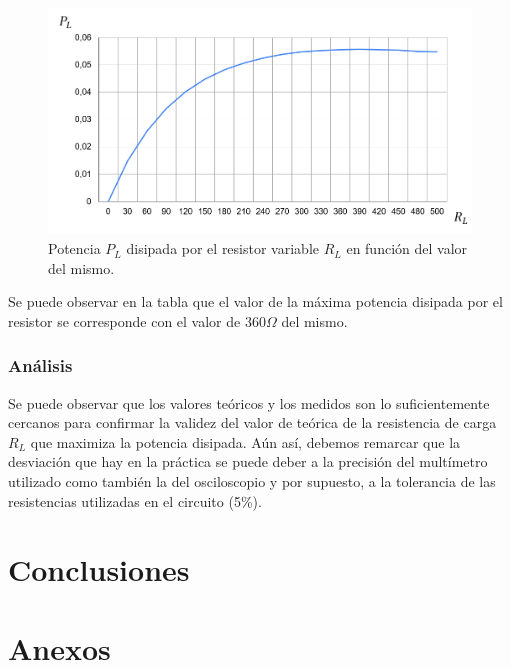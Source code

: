 \documentclass{article}
\begin{document}
            \begin{figure}[H]
                \centering
                \includegraphics[width=1\textwidth]{graficoCuentasTeoricas.png}
                \caption{Potencia $P_L$ disipada por el resistor variable $R_L$ en función del valor del mismo.}
                \label{fig:esquemáticaPotencia}
            \end{figure}

            \quad Se puede observar en la tabla que el valor de la máxima potencia disipada por el resistor se corresponde con el valor de $ 360 \Omega $ del mismo.

            \subsubsection{Análisis}
            \quad Se puede observar que los valores teóricos y los medidos son lo suficientemente cercanos para confirmar 
            la validez del valor de teórica de la resistencia de carga $R_L$ que maximiza la potencia disipada.
            Aún así, debemos remarcar que la desviación que hay en la práctica se puede deber a la precisión del multímetro utilizado como también la del osciloscopio
            y por supuesto, a la tolerancia de las resistencias utilizadas en el circuito (5\%).
    \section{Conclusiones}

    \section{Anexos}
\end{document}
